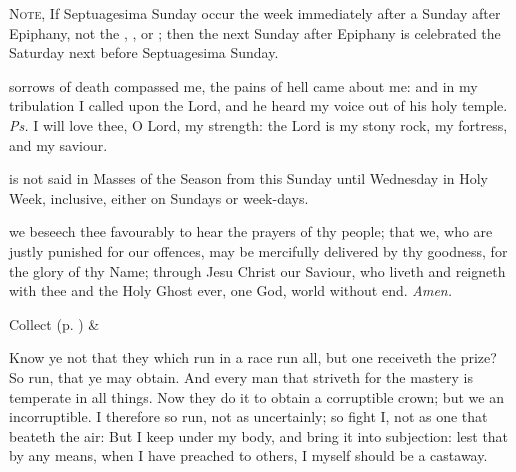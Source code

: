 
\begin{rubric}
	\textsc{Note,} If Septuagesima Sunday occur the week immediately after a Sunday after Epiphany, not the , , or ; then the next Sunday after Epiphany is celebrated the Saturday next before Septuagesima Sunday.
\end{rubric}


\introit
{} sorrows of death compassed me, the pains of hell came about me: and in my tribulation I called upon the Lord, and he heard my voice out of his holy temple. \textit{Ps.} I will love thee, O Lord, my strength: the Lord is my stony rock, my fortress, and my saviour.

\begin{rubric}
     is not said in Masses of the Season from this Sunday until Wednesday in Holy Week, inclusive, either on Sundays or week-days.
\end{rubric}

\collect
{} we beseech thee favourably to hear the prayers of thy people; that we, who are justly punished for our offences, may be mercifully delivered by thy goodness, for the glory of thy Name; through Jesu Christ our Saviour, who liveth and reigneth with thee and the Holy Ghost ever, one God, world without end. \textit{Amen.}
\begin{rubric}
     Collect  (p. \pageref{SPSaints}) \&  
\end{rubric}

 Know ye not that they which run in a race run all, but one receiveth the prize? So run, that ye may obtain. And every man that striveth for the mastery is temperate in all things. Now they do it to obtain a corruptible crown; but we an incorruptible. I therefore so run, not as uncertainly; so fight I, not as one that beateth the air: But I keep under my body, and bring it into subjection: lest that by any means, when I have preached to others, I myself should be a castaway.


